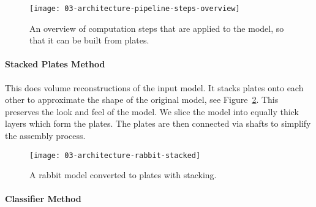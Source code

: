 \documentclass[../../ClassicThesis.tex]{subfiles}
\begin{document}

\begin{figure}[h]
  \centering
  \texttt{[image: 03-architecture-pipeline-steps-overview]}
  \caption{An overview of computation steps that are applied
    to the model, so that it can be built from plates.}
  \label{fig:overview-plate-steps}
\end{figure}



\paragraph{Stacked Plates Method}

This \class{\fabmethod} does volume reconstructions of the
input model. It stacks plates onto each other to approximate
the shape of the original model, see
Figure~\ref{fig:stacked-rabbit}. This preserves the look and
feel of the model. We slice the model into equally thick
layers which form the plates. The plates are then connected
via shafts to simplify the assembly process.

\begin{figure}[h]
  \centering
  \texttt{[image: 03-architecture-rabbit-stacked]}
  \caption{A rabbit model converted to plates with
    stacking.}
  \label{fig:stacked-rabbit}
\end{figure}

\paragraph{Classifier Method}
\end{document}
